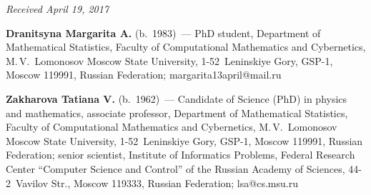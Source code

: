 \vspace*{-3pt}

\hfill{\small\textit{Received April 19, 2017}}


\Contr

\noindent
\textbf{Dranitsyna Margarita A.} (b.\ 1983)~---
PhD student, Department of Mathematical Statistics, Faculty of Computational 
Mathematics and Cybernetics, M.\,V.~Lomonosov Moscow State University, 
1-52~Leninskiye Gory, GSP-1, Moscow 119991, Russian Federation; 
\mbox{margarita13april@mail.ru}

\vspace*{3pt}

\noindent
\textbf{Zakharova Tatiana V.} (b.\ 1962)~---
Candidate of Science (PhD) in physics and mathematics, associate professor, 
Department of Mathematical Statistics, Faculty of Computational Mathematics 
and Cybernetics, M.\,V.~Lomonosov Moscow State University, 1-52~Leninskiye 
Gory, GSP-1, Moscow 119991, Russian Federation; senior scientist, 
Institute of Informatics Problems, Federal Research Center ``Computer 
Science and Control'' of the Russian Academy of Sciences, 44-2~Vavilov Str., 
Moscow 119333, Russian Federation; \mbox{lsa@cs.msu.ru}

\label{end\stat}


\renewcommand{\bibname}{\protect\rm Литература} 